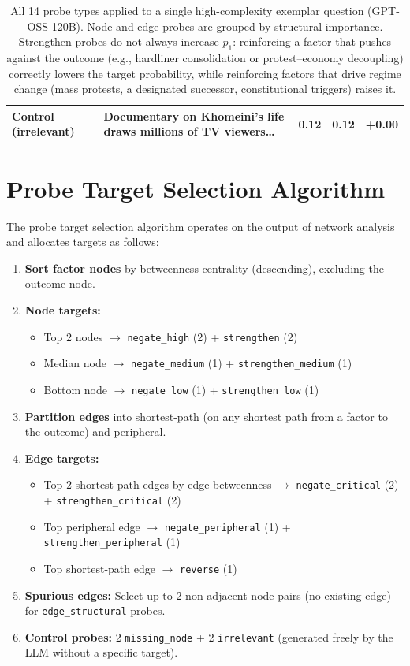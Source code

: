 \documentclass[11pt]{article}
\begin{document}
\begin{table}[t]
\begin{tabular}{lp{8.5cm}ccc}
Control (irrelevant) & Documentary on Khomeini's life draws millions of TV viewers\ldots & 0.12 & 0.12 & +0.00 \\
\bottomrule
\end{tabular}
\caption{All 14 probe types applied to a single high-complexity exemplar question (GPT-OSS 120B). Node and edge probes are grouped by structural importance. Strengthen probes do not always increase $p_1$: reinforcing a factor that pushes against the outcome (e.g., hardliner consolidation or protest--economy decoupling) correctly lowers the target probability, while reinforcing factors that drive regime change (mass protests, a designated successor, constitutional triggers) raises it.}
\label{tab:probe_examples}
\end{table}

\section{Probe Target Selection Algorithm}
\label{app:target-selection}

The probe target selection algorithm operates on the output of network analysis and allocates targets as follows:

\begin{enumerate}
\item \textbf{Sort factor nodes} by betweenness centrality (descending), excluding the outcome node.
\item \textbf{Node targets:}
    \begin{itemize}
    \item Top 2 nodes $\rightarrow$ \texttt{negate\_high} (2) + \texttt{strengthen} (2)
    \item Median node $\rightarrow$ \texttt{negate\_medium} (1) + \texttt{strengthen\_medium} (1)
    \item Bottom node $\rightarrow$ \texttt{negate\_low} (1) + \texttt{strengthen\_low} (1)
    \end{itemize}
\item \textbf{Partition edges} into shortest-path (on any shortest path from a factor to the outcome) and peripheral.
\item \textbf{Edge targets:}
    \begin{itemize}
    \item Top 2 shortest-path edges by edge betweenness $\rightarrow$ \texttt{negate\_critical} (2) + \texttt{strengthen\_critical} (2)
    \item Top peripheral edge $\rightarrow$ \texttt{negate\_peripheral} (1) + \texttt{strengthen\_peripheral} (1)
    \item Top shortest-path edge $\rightarrow$ \texttt{reverse} (1)
    \end{itemize}
\item \textbf{Spurious edges:} Select up to 2 non-adjacent node pairs (no existing edge) for \texttt{edge\_structural} probes.
\item \textbf{Control probes:} 2 \texttt{missing\_node} + 2 \texttt{irrelevant} (generated freely by the LLM without a specific target).
\end{enumerate}
\end{document}

